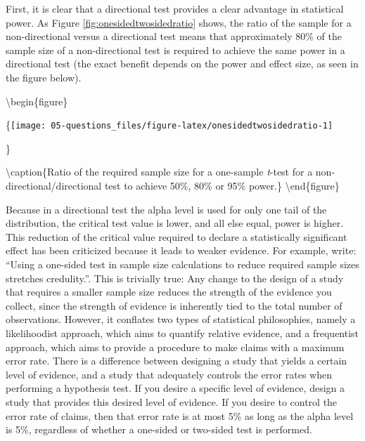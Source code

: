 \documentclass[
  oneside]{book}
\begin{document}
First, it is clear that a directional test provides a clear advantage in statistical power. As Figure \ref{fig:onesidedtwosidedratio} shows, the ratio of the sample for a non-directional versus a directional test means that approximately 80\% of the sample size of a non-directional test is required to achieve the same power in a directional test (the exact benefit depends on the power and effect size, as seen in the figure below).

\textbackslash begin\{figure\}

\{\centering \texttt{[image: 05-questions\_files/figure-latex/onesidedtwosidedratio-1]}

\}

\textbackslash caption\{Ratio of the required sample size for a one-sample \emph{t}-test for a non-directional/directional test to achieve 50\%, 80\% or 95\% power.\}\label{fig:onesidedtwosidedratio}
\textbackslash end\{figure\}

Because in a directional test the alpha level is used for only one tail of the distribution, the critical test value is lower, and all else equal, power is higher. This reduction of the critical value required to declare a statistically significant effect has been criticized because it leads to weaker evidence. For example, \citet{schulz_sample_2005} write: ``Using a one-sided test in sample size calculations to reduce required sample sizes stretches credulity.''. This is trivially true: Any change to the design of a study that requires a smaller sample size reduces the strength of the evidence you collect, since the strength of evidence is inherently tied to the total number of observations. However, it conflates two types of statistical philosophies, namely a likelihoodist approach, which aims to quantify relative evidence, and a frequentist approach, which aims to provide a procedure to make claims with a maximum error rate. There is a difference between designing a study that yields a certain level of evidence, and a study that adequately controls the error rates when performing a hypothesis test. If you desire a specific level of evidence, design a study that provides this desired level of evidence. If you desire to control the error rate of claims, then that error rate is at most 5\% as long as the alpha level is 5\%, regardless of whether a one-sided or two-sided test is performed.
\end{document}
